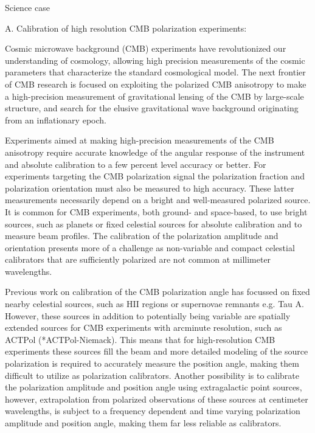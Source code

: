 Science case

A. Calibration of high resolution CMB polarization experiments:

Cosmic microwave background (CMB) experiments have revolutionized our understanding of cosmology, allowing high precision measurements of the cosmic parameters that characterize the standard cosmological model. The next frontier of CMB research is focused on exploiting the polarized CMB anisotropy to make a high-precision measurement of gravitational lensing of the CMB by large-scale structure, and search for the elusive gravitational wave background originating from an inflationary epoch.

Experiments aimed at making high-precision measurements of the CMB anisotropy require accurate knowledge of the angular response of the instrument and absolute calibration to a few percent level accuracy or better. For experiments targeting the CMB polarization signal the polarization fraction and polarization orientation must also be measured to high accuracy. These latter measurements necessarily depend on a bright and well-measured polarized source. It is common for CMB experiments, both ground- and space-based, to use bright sources, such as planets or fixed celestial sources for absolute calibration and to measure beam profiles. The calibration of the polarization amplitude and orientation presents more of a challenge as non-variable and compact celestial calibrators that are sufficiently polarized are not common at millimeter wavelengths.
 
Previous work on calibration of the CMB polarization angle has focussed on fixed nearby celestial sources, such as HII regions or supernovae remnants e.g. Tau A. However, these sources in addition to potentially being variable are spatially extended sources for CMB experiments with arcminute resolution, such as ACTPol (*ACTPol-Niemack). This means that for high-resolution CMB experiments these sources fill the beam and more detailed modeling of the source polarization is required to accurately measure the position angle, making them difficult to utilize as polarization calibrators. Another possibility is to calibrate the polarization amplitude and position angle using extragalactic point sources, however, extrapolation from  polarized observations of these sources at centimeter wavelengths, is subject to a frequency dependent and time varying polarization amplitude and position angle, making them far less reliable as calibrators.

